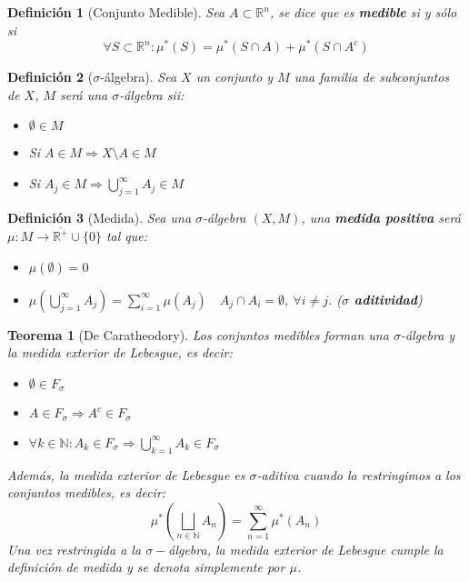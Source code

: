 \documentclass[10pt,a4paper,openright]{book}
\theoremstyle{break}
\newtheorem*{defi}{Definición}
\newtheorem*{theo}{Teorema}
\begin{document}
\begin{defi}[Conjunto Medible]
Sea $A \subset \mathbb{R}^n$, se dice que es \textbf{medible} si y sólo si
$$\forall S \subset \mathbb{R}^n : \mu^*\left( S \right) = \mu^*\left( S\cap A \right) + \mu^*\left( S \cap A^c \right)$$
\end{defi}

\begin{defi}[\texorpdfstring{$\sigma$}{sigma}-álgebra]
Sea $X$ un conjunto y $M$ una familia de subconjuntos de $X$, $M$ será una $\sigma$-álgebra sii:
\begin{itemize}
    \item $\emptyset \in M$
    \item Si $A \in M \Rightarrow X\setminus A \in M$
    \item Si $A_j \in M \Rightarrow \bigcup_{j = 1}^{\infty} A_j \in M$
\end{itemize}
\end{defi}

\begin{defi}[Medida]
Sea una $\sigma$-álgebra $\left( X, M \right)$, una \textbf{medida positiva} será $\mu: M \rightarrow \overline{\mathbb{R}^+} \cup \{0\}$ tal que:
\begin{itemize}
    \item $\mu\left( \emptyset \right) = 0$
    \item $\mu\left( \bigcup_{j = 1}^{\infty} A_j \right) = \sum_{i=1}^{\infty} \mu \left( A_j \right)\quad A_j \cap A_i = \emptyset,\ \forall i \neq j$. (\textbf{$\sigma$ aditividad})
\end{itemize}
\end{defi}

\begin{theo}[De Caratheodory]
Los conjuntos medibles forman una $\sigma$-álgebra y la medida exterior de Lebesgue, es decir:
\begin{itemize}
\item $\emptyset \in F_\sigma$
\item $A\in F_ \sigma \Rightarrow A^c \in F_\sigma$
\item $\forall k \in \mathbb{N}: A_k \in F_\sigma \Rightarrow \bigcup_{k=1}^\infty A_k \in F_\sigma$
\end{itemize}
Además, la medida exterior de Lebesgue es $ \sigma$-aditiva cuando la restringimos a los conjuntos medibles, es decir:
$$\mu^*\left(\bigsqcup_{n\in \mathbb{N}}A_n\right) = \sum_{n=1}^\infty \mu^*(A_n)$$
Una vez restringida a la $\sigma-$álgebra, la medida exterior de Lebesgue cumple la definición de medida y se denota simplemente por $\mu$.
\end{theo}
\end{document}
